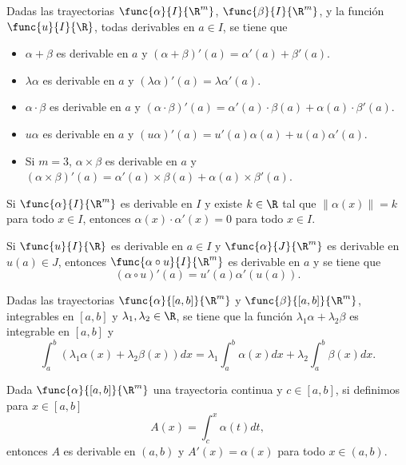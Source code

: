 \documentclass[a4,11pt]{aleph-notas}
\begin{document}
\begin{teo}
    Dadas las trayectorias $\func{\alpha}{I}{\R^m}$, $\func{\beta}{I}{\R^m}$, y la función $\func{u}{I}{\R}$, todas derivables en $a\in I$, se tiene que
    \begin{itemize}
        \item $\alpha+\beta$ es derivable en $a$ y $(\alpha+\beta)'(a)=\alpha'(a)+\beta'(a)$.
        \item $\lambda \alpha$ es derivable en $a$ y $(\lambda \alpha)'(a)=\lambda \alpha'(a)$.
        \item $\alpha \cdot \beta$ es derivable en $a$ y $(\alpha \cdot \beta)'(a)=\alpha'(a)\cdot \beta(a)+\alpha(a)\cdot \beta'(a)$.
        \item $u \alpha$ es derivable en $a$ y $(u \alpha)'(a)=u'(a) \alpha(a)+u(a) \alpha'(a)$.
        \item Si $m=3$, $\alpha \times \beta$ es derivable en $a$ y $(\alpha \times \beta)'(a)=\alpha'(a)\times \beta(a)+\alpha(a)\times \beta'(a)$.
    \end{itemize}
\end{teo}

\begin{prop}
    Si $\func{\alpha}{I}{\R^m}$ es derivable en $I$ y existe $k\in\R$ tal que $\|\alpha(x)\|=k$ para todo $x\in I$, entonces $\alpha(x)\cdot \alpha'(x)=0$ para todo $x\in I$.
\end{prop}

\begin{teo}
    Si $\func{u}{I}{\R}$ es derivable en $a\in I$ y $\func{\alpha}{J}{\R^m}$ es derivable en $u(a)\in J$, entonces $\func{\alpha\circ u}{I}{\R^m}$ es derivable en $a$ y se tiene que
    \[
        (\alpha\circ u)'(a)=u'(a)\alpha'(u(a)).
    \]
\end{teo}

\begin{prop}
    Dadas las trayectorias $\func{\alpha}{[a,b]}{\R^m}$ y $\func{\beta}{[a,b]}{\R^m}$, integrables en $[a,b]$ y $\lambda_1,\lambda_2\in\R$, se tiene que la función $\lambda_1 \alpha + \lambda_2 \beta$ es integrable en $[a,b]$ y
    \[
        \int_a^b(\lambda_1 \alpha(x) + \lambda_2 \beta(x) )dx
        = \lambda_1\int_a^b \alpha(x)dx + \lambda_2 \int_a^b \beta(x) dx.
    \]
\end{prop}

\begin{teo}
    Dada $\func{\alpha}{[a,b]}{\R^m}$ una trayectoria continua y $c\in[a,b]$, si definimos para $x\in[a,b]$
    \[
        A(x)=\int_c^x \alpha(t) dt,
    \]
    entonces $A$ es derivable en $(a,b)$ y $A'(x)=\alpha(x)$ para todo $x\in(a,b)$.
\end{teo}
\end{document}
